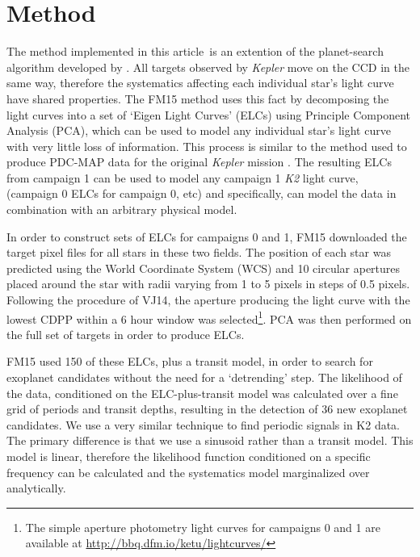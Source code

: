 \documentclass[useAMS, usenatbib, preprint, 12pt]{aastex}
\newcommand{\article}{article}
\begin{document}
\section{Method}
\label{sec:Method}

The method implemented in this \article\ is an extention of the planet-search
algorithm developed by \citet[][hereafter FM15]{Foreman-Mackey2015}.
All targets observed by {\it Kepler} move on the CCD in the same way,
therefore the systematics affecting each individual star's light curve have
shared properties.
The FM15 method uses this fact by decomposing the light curves into a set
of `Eigen Light Curves' (ELCs) using Principle Component Analysis (PCA), which
can be used to model any individual star's light curve with very little loss
of information.
This process is similar to the method used to produce PDC-MAP data for the
original {\it Kepler} mission \citep[][]{Stumpe2012, Smith2012}.
The resulting ELCs from campaign 1 can be used to model any campaign 1 {\it
K2} light curve, (campaign 0 ELCs for campaign 0, etc) and specifically, can
model the data in combination with an arbitrary physical model.

In order to construct sets of ELCs for campaigns 0 and 1, FM15 downloaded the
target pixel files for all stars in these two fields.
The position of each star was predicted using the World Coordinate System (WCS)
and 10 circular apertures placed around the star with radii varying from 1 to
5 pixels in steps of 0.5 pixels.
Following the procedure of VJ14, the aperture producing the
light curve with the lowest CDPP within a 6 hour window
\citep{Christiansen2012} was selected\footnote{The simple aperture photometry
light curves for campaigns 0 and 1 are available at
\url{http://bbq.dfm.io/ketu/lightcurves/}}.
PCA was then performed on the full set of targets in order to produce ELCs.

FM15 used 150 of these ELCs, plus a transit model, in order to
search for exoplanet candidates without the need for a `detrending' step.
The likelihood of the data, conditioned on the ELC-plus-transit
model was calculated over a fine grid of periods and transit depths, resulting
in the detection of 36 new exoplanet candidates.
We use a very similar technique to find periodic signals in K2 data.
The primary difference is that we use a sinusoid rather than a transit model.
This model is linear, therefore the likelihood function conditioned on
a specific frequency can be calculated and the systematics model marginalized
over analytically.
\end{document}
